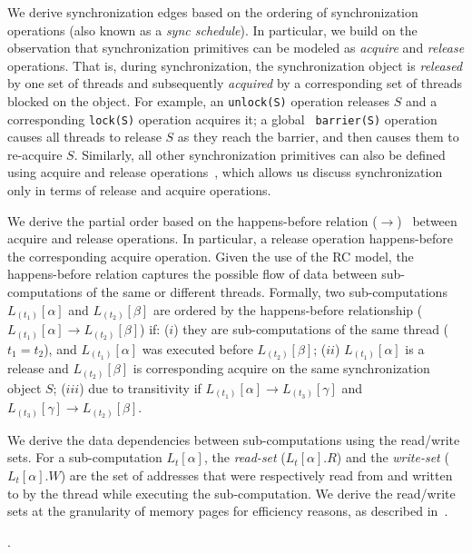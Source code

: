  We derive synchronization edges based on the ordering of synchronization operations (also known as a {\em sync schedule}). In particular,  we build on the observation that synchronization primitives can be modeled as {\em acquire} and {\em release} operations. That is,   during synchronization, the synchronization object is {\em released} by one set of threads and subsequently  {\em acquired} by a corresponding set of threads blocked on the object. For example, an {\tt unlock(S)} operation releases $S$
and a corresponding {\tt lock(S)} operation acquires it; a global {\tt
barrier(S)} operation causes all threads to release $S$ as they reach the
barrier, and then causes them to re-acquire $S$. Similarly, all other
synchronization primitives can also be defined using acquire and release
operations~\cite{djit, fast-track-pldi}, which allows us discuss synchronization only in terms of release and acquire operations.


We derive the partial order based on the happens-before relation
($\rightarrow$)~\cite{djit,fast-track-pldi} between acquire and release operations. In particular, a release
operation happens-before the corresponding acquire operation. Given
the use of the RC model, the happens-before relation
captures the possible flow of data between sub-computations of the same or different threads.
Formally, two sub-computations $L_{(t_1)}[\alpha]$ and
$L_{(t_2)}[\beta]$ are ordered by the happens-before relationship ($L_{(t_1)}[\alpha] \rightarrow
L_{(t_2)}[\beta]$) if:  ($i$)  they are sub-computations of the
same thread ($t_1 = t_2$), and $L_{(t_1)}[\alpha]$ was executed before $L_{(t_2)}[\beta]$; ($ii$)  $L_{(t_1)}[\alpha]$  is a release and $L_{(t_2)}[\beta]$ is corresponding acquire on the same synchronization object $S$; ($iii$) due to transitivity if  
 $L_{(t_1)}[\alpha] \rightarrow L_{(t_3)}[\gamma] $ and $L_{(t_3)}[\gamma]  \rightarrow L_{(t_2)}[\beta]$.


 We derive the data dependencies between sub-computations using the read/write sets. For a sub-computation $L_t[\alpha]$, the {\em read-set}
($L_t[\alpha].R$) and the {\em write-set} ($L_t[\alpha].W$) are the set of
addresses that were respectively read from and written to by
the thread while executing the sub-computation. We derive the read/write sets at the granularity of memory pages for efficiency reasons, as described in~.

.




